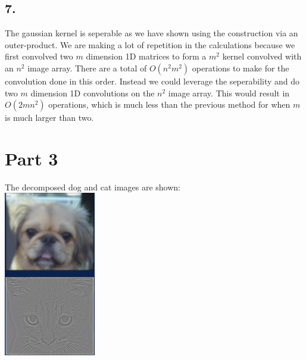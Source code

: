\documentclass[12pt]{article}
\begin{document}
\subsection*{7.}
The gaussian kernel is seperable as we have shown using the construction via an outer-product. We are making a lot of repetition in the calculations because we first convolved two $m$ dimension 1D matrices to form a $m^2$ kernel convolved with an $n^2$ image array. There are a total of $O(n^2m^2)$ operations to make for the convolution done in this order.  Instead we could leverage the seperability and do two $m$ dimension 1D convolutions on the $n^2$ image array. This would result in $O(2mn^2 )$ operations, which is much less than the previous method for when $m$ is much larger than two. 

\section*{Part 3}
The decomposed dog and cat images are shown:\\
\includegraphics[width=0.3\textwidth]{imgs/pt3-1.png}
\end{document}
